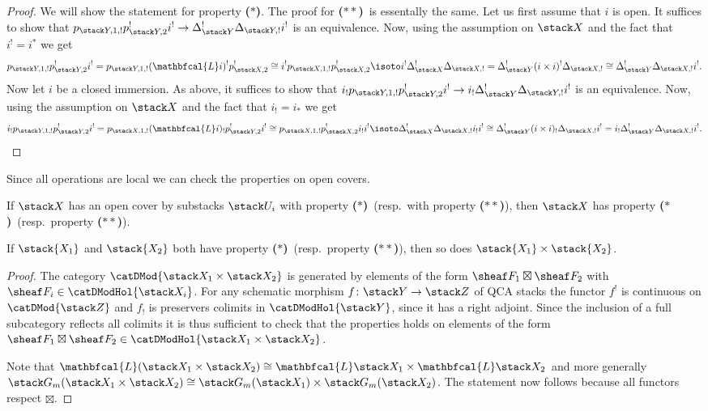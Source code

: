 \documentclass{ck-article}
\newcommand\bc{\textbf{($\mathbf{*}$)}}
\newcommand\hbc{\textbf{($\mathbf{**}$)}}
\renewcommand\ls[1]{\mathbfcal{L} #1}
\begin{document}
\begin{proof}
    We will show the statement for property \bc.
    The proof for \hbc\ is essentally the same.
    Let us first assume that $i$ is open.
    It suffices to show that $p_{\stack Y,1,!}p_{\stack Y,2}^!i^! \to \Delta_{\stack Y}^!\Delta_{\stack Y,!}i^!$ is an equivalence.
    Now, using the assumption on $\stack X$ and the fact that $i^! = i^*$ we get
    \[
        p_{\stack Y,1,!} p_{\stack Y,2}^!i^! =
        p_{\stack Y,1,!} (\ls i)^! p_{\stack X,2}^! \cong
        i^! p_{\stack X,1,!} p_{\stack X,2}^! \isoto
        i^! \Delta_{\stack X}^! \Delta_{\stack X,!} =
        \Delta_{\stack Y}^! (i\times i)^! \Delta_{\stack X,!} \cong
        \Delta_{\stack Y}^! \Delta_{\stack X,!} i^!.
    \]
    Now let $i$ be a closed immersion.
    As above, it suffices to show that $i_!p_{\stack Y,1,!}p_{\stack Y,2}^!i^! \to i_!\Delta_{\stack Y}^!\Delta_{\stack Y,!}i^!$ is an equivalence.
    Now, using the assumption on $\stack X$ and the fact that $i_! = i_*$ we get
    \[
        i_! p_{\stack Y,1,!} p_{\stack Y,2}^!i^! =
        p_{\stack X,1,!} (\ls i)_! p_{\stack Y,2}^!i^! \cong
        p_{\stack X,1,!} p_{\stack X,2}^! i_!i^! \isoto
        \Delta_{\stack X}^! \Delta_{\stack X,!} i_!i^! \cong
        \Delta_{\stack Y}^! (i\times i)_! \Delta_{\stack X,!}i^! =
        i_! \Delta_{\stack Y}^! \Delta_{\stack X,!} i^!.
        \qedhere
    \]
\end{proof}

Since all operations are local we can check the properties on open covers.

\begin{Lem}\label{lem:open_cover}
    If $\stack X$ has an open cover by substacks $\stack U_i$ with property \bc\ (resp.~with property \hbc), then $\stack X$ has property \bc\ (resp.~property \hbc).
\end{Lem}

\begin{Lem}\label{lem:product}
    If $\stack{X_1}$ and $\stack{X_2}$ both have property \bc\ (resp.~property \hbc), then so does $\stack{X_1} \times \stack{X_2}$.
\end{Lem}

\begin{proof}
    The category $\catDMod{\stack X_1 \times \stack X_2}$ is generated by elements of the form $\sheaf F_1 \boxtimes \sheaf F_2$ with $\sheaf F_i \in \catDModHol{\stack X_i}$.
    For any schematic morphism $f\colon \stack Y \to \stack Z$ of QCA stacks the functor $f^!$ is continuous on $\catDMod{\stack Z}$ and $f_!$ is preservers colimits in $\catDModHol{\stack Y}$, since it has a right adjoint.
    Since the inclusion of a full subcategory reflects all colimits it is thus sufficient to check that the properties holds on elements of the form $\sheaf F_1 \boxtimes \sheaf F_2 \in \catDModHol{\stack X_1 \times \stack X_2}$.
    
    Note that $\ls(\stack X_1 \times \stack X_2) \cong \ls \stack X_1 \times \ls \stack X_2$ and more generally $\stack G_m(\stack X_1 \times \stack X_2) \cong \stack G_m(\stack X_1) \times \stack G_m(\stack X_2)$.
    The statement now follows because all functors respect $\boxtimes$.
\end{proof}
\end{document}
